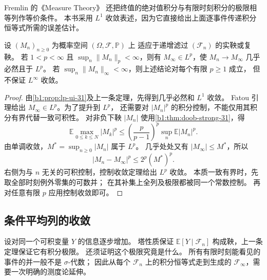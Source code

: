 Fremlin 的《Measure Theory》\cite[275H]{Fremlin2016Measure}
还把终值的绝对值积分与有限时刻积分的极限相等列作等价条件。
本书采用 \(L^1\) 收敛表述，因为它直接给出上面逐事件传递积分恒等式所需的误差估计。

\begin{corollary}[一致高阶矩下的积分收敛]
\label{b1:cor:lp-martingale-convergence-31}
设 \((M_n)_{n\geq0}\) 为概率空间 \((\Omega,\mathcal F,\mathbb P)\) 上
适应于递增滤过 \((\mathcal F_n)\) 的实鞅或复鞅。
若 \(1<p<\infty\) 且 \(\sup_n\|M_n\|_p<\infty\)，则有
\(M_\infty\in L^p\)，使 \(M_n\to M_\infty\) 几乎必然且于 \(L^p\)。
若 \(\sup_n\|M_n\|_\infty<\infty\)，则上述结论对每个有限 \(p\geq1\) 成立，
但不保证 \(L^\infty\) 收敛。
\end{corollary}
\begin{proof}
由\cref{b1:prop:lp-ui-31}及上一条定理，先得到几乎必然和 \(L^1\) 收敛。
Fatou 引理给出 \(M_\infty\in L^p\)。为了提升到 \(L^p\)，
还需要对 \(|M_n|^p\) 的积分控制，不能仅用其积分有界代替一致可积性。
对非负下鞅 \(|M_n|\) 使用\cref{b1:thm:doob-strong-31}，得
\[
 \mathbb E\max_{0\leq k\leq N}|M_k|^p
 \leq\left(\frac p{p-1}\right)^p\sup_n\mathbb E|M_n|^p.
\]
由单调收敛，\(M^*=\sup_{n\geq0}|M_n|\) 属于 \(L^p\)。
几乎处处又有 \(|M_\infty|\leq M^*\)，所以
\[
 |M_n-M_\infty|^p\leq 2^p(M^*)^p.
\]
右侧为与 \(n\) 无关的可积控制，控制收敛定理给出 \(L^p\) 收敛。
本质一致有界时，先取全部时刻例外零集的可数并；
在其补集上全列及极限都被同一个常数控制。
再对任意有限 \(p\) 应用控制收敛即可。
\end{proof}

\subsection{条件平均列的收敛}
\label{b1:subsec:310603}

设对同一个可积变量 \(Y\) 的信息逐步增加。
塔性质保证 \(\mathbb E[Y\mid\mathcal F_n]\) 构成鞅，上一条定理保证它有积分极限。
还须证明这个极限究竟是什么。
所有有限时刻能看见的事件的并一般不是 \(\sigma\)-代数；
因此从每个 \(\mathcal F_n\) 上的积分恒等式走到生成的 \(\mathcal F_\infty\)，需要一次明确的测度论延伸。


